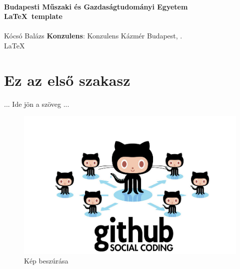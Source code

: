 \documentclass[12pt,a4paper,oneside]{article}             	%
\newcommand{\doctitle}{\LaTeX\ template}
\newcommand{\docsubtitle}{}
\newcommand{\docauthor}{Kócsó Balázs}
\newcommand{\docconsultant}{Konzulens Kázmér}
\newcommand{\docplace}{Budapest}
\newcommand{\docyear}{\the\year}
\begin{document}
\begin{titlepage}
\begin{center}
     \\
    {\large \bf Budapesti Műszaki és Gazdaságtudományi Egyetem} \\
    \vfill {\Huge \bf \doctitle \mbox{}} \\
    [15pt]{\Large \docsubtitle \mbox{}} \\
    [30pt]{\Huge \docauthor} \vfill
    {\bf Konzulens}: \docconsultant
    \vfill
    {\Large \docplace, \docyear.} \\
    \LaTeX %
\end{center}
\end{titlepage}

\section{Ez az első szakasz}
... Ide jön a szöveg ...

\begin{figure}[H]	%
\center
\includegraphics[width=\textwidth, keepaspectratio]{figures/picture.jpg}
\caption{Kép beszúrása}
\label{picture}		%
\end{figure}





%
%
\end{document}

